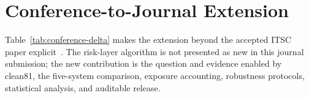 \documentclass[journal,onecolumn]{IEEEtran}
\begin{document}


\section{Conference-to-Journal Extension}

Table~\ref{tab:conference-delta} makes the extension beyond the accepted ITSC
paper explicit~\cite{paloi_itsc2026}. The risk-layer algorithm is not presented
as new in this journal submission; the new contribution is the question and
evidence enabled by clean81, the five-system comparison, exposure accounting,
robustness protocols, statistical analysis, and auditable release.





\end{document}

